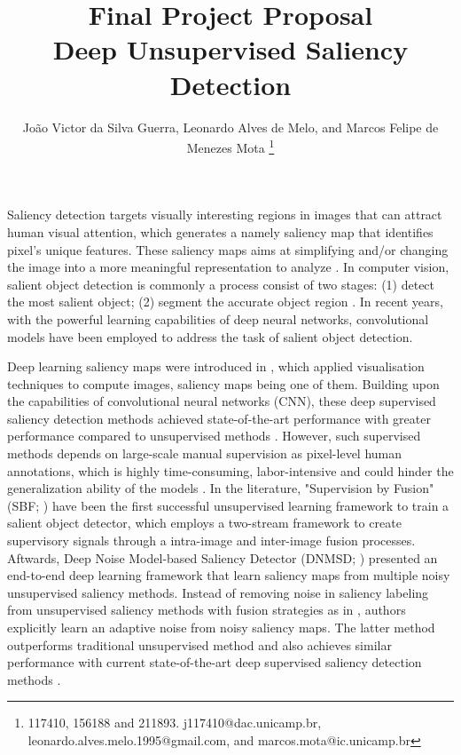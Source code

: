 \documentclass{article}
\begin{document}
\title{Final Project Proposal \\
\large Deep Unsupervised Saliency Detection}
\author{
Jo\~ao Victor da Silva Guerra,
Leonardo Alves de Melo,
and Marcos Felipe de Menezes Mota
\thanks{117410, 156188 and 211893. j117410@dac.unicamp.br, leonardo.alves.melo.1995@gmail.com, and marcos.mota@ic.unicamp.br}
}

\maketitle

Saliency detection targets visually interesting regions in images that can attract human visual attention, which generates a namely saliency map that identifies pixel's unique features. These saliency maps aims at simplifying and/or changing the image into a more meaningful representation to analyze \cite{zhang2018, symonyan2014}. In computer vision, salient object detection is commonly a process consist of two stages: (1) detect the most salient object; (2) segment the accurate object region \cite{zhang2014}. In recent years, with the powerful learning capabilities of deep neural networks, convolutional models have been employed to address the task of salient object detection.

Deep learning saliency maps were introduced in \cite{symonyan2014}, which applied visualisation techniques to compute images, saliency maps being one of them. Building upon the capabilities of convolutional neural networks (CNN), these deep supervised saliency detection methods achieved state-of-the-art performance with greater performance compared to unsupervised methods \cite{zhang2018}. However, such supervised methods depends on large-scale manual supervision as pixel-level human annotations, which is highly time-consuming, labor-intensive and could hinder the generalization ability of the models \cite{zhang2018, zhang2014}. In the literature, "Supervision by Fusion" (SBF; \cite{zhang2017}) have been the first successful unsupervised learning framework to train a salient object detector, which employs a two-stream framework to create supervisory signals through a intra-image and inter-image fusion processes. Aftwards, Deep Noise Model-based Saliency Detector (DNMSD; \cite{zhang2018}) presented an end-to-end deep learning framework that learn saliency maps from multiple noisy unsupervised saliency methods. Instead of removing noise in saliency labeling from unsupervised saliency methods with fusion strategies as in \cite{zhang2017}, authors explicitly learn an adaptive noise from noisy saliency maps. The latter method outperforms traditional unsupervised method and also achieves similar performance with current state-of-the-art deep supervised saliency detection methods \cite{zhang2018}. 
\end{document}
